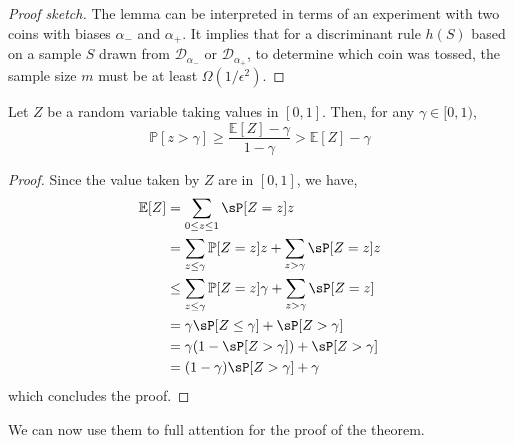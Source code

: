 \begin{proof}[Proof sketch]
The lemma can be interpreted in terms of an experiment with two coins 
with biases $\alpha_{-}$ and $\alpha_{+}$. 
It implies that for a discriminant rule $h(S)$ based on a sample $S$ 
drawn from $\mathcal{D}_{\alpha_{-}}$ or $\mathcal{D}_{\alpha_{+}}$, 
to determine which coin was tossed, the sample size $m$ must be at least $\Omega(1/\epsilon^{2})$. 
\end{proof}

\begin{lemma}
    Let $Z$ be a random variable taking values in $[0,1]$. Then, for any $\gamma\in [0,1)$, 
    \begin{equation}
        \mathbb{P}[z>\gamma] \geq \frac{\mathbb{E}[Z]-\gamma}{1-\gamma} > \mathbb{E}[Z] - \gamma
    \end{equation}
\end{lemma}
\begin{proof}
    Since the value taken by $Z$ are in $[0,1]$, we have, 
    \begin{equation}
        \begin{split}
            \mathbb{E}[Z] 
            & = \sum_{0\leq z \leq 1} \sP [Z=z]z\\
            & = \sum_{z\leq \gamma} \mathbb{P}[Z=z]z + \sum_{z> \gamma} \sP[Z=z]z\\
            & \leq \sum_{z\leq \gamma} \mathbb{P}[Z=z]\gamma + \sum_{z> \gamma} \sP[Z=z]\\
            & = \gamma \sP [Z\leq \gamma] + \sP [Z>\gamma] \\
            & = \gamma (1 - \sP [Z>\gamma]) + \sP[Z>\gamma]\\
            & = (1-\gamma) \sP [Z>\gamma] + \gamma
        \end{split}
    \end{equation}
    which concludes the proof. 
\end{proof}
We can now use them to full attention for the proof of the theorem. 
